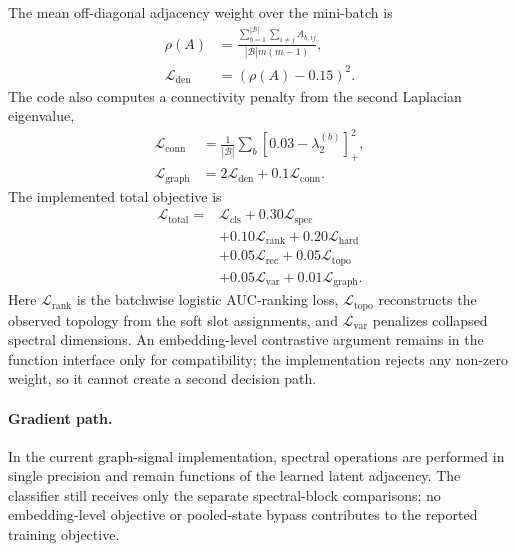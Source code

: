 \documentclass[authoryear,final,5p,times,twocolumn]{elsarticle}
\newcommand{\relu}[1]{\left[#1\right]_{+}}
\theoremstyle{plain}
\begin{document}
The mean off-diagonal adjacency weight over the mini-batch is
\begin{equation}
\begin{aligned}
\rho(A)
&=\frac{
\sum_{b=1}^{|\mathcal{B}|}\sum_{i\neq j}A_{b,ij}
}{|\mathcal{B}|m(m-1)},\\
\mathcal{L}_{\mathrm{den}}
&=(\rho(A)-0.15)^2.
\end{aligned}
\end{equation}
\begingroup
\color{green!50!black}
The code also computes a connectivity penalty from the second Laplacian
eigenvalue,
\begin{equation}
\begin{aligned}
\mathcal{L}_{\mathrm{conn}}
&=\frac{1}{|\mathcal{B}|}
\sum_b\relu{0.03-\lambda_2^{(b)}}^2,\\
\mathcal{L}_{\mathrm{graph}}
&=2\mathcal{L}_{\mathrm{den}}
+0.1\mathcal{L}_{\mathrm{conn}}.
\end{aligned}
\label{eq:graph_regularizer}
\end{equation}
\endgroup
The implemented total objective is
\begin{equation}
\boxed{
\begin{aligned}
\mathcal{L}_{\mathrm{total}}
={}&\mathcal{L}_{\mathrm{cls}}
+0.30\mathcal{L}_{\mathrm{spec}}\\
&+0.10\mathcal{L}_{\mathrm{rank}}
+0.20\mathcal{L}_{\mathrm{hard}}\\
&+0.05\mathcal{L}_{\mathrm{rec}}
+0.05\mathcal{L}_{\mathrm{topo}}\\
&+0.05\mathcal{L}_{\mathrm{var}}
+0.01\mathcal{L}_{\mathrm{graph}}.
\end{aligned}}
\label{eq:complete_loss}
\end{equation}
Here $\mathcal{L}_{\mathrm{rank}}$ is the batchwise logistic AUC-ranking loss,
$\mathcal{L}_{\mathrm{topo}}$ reconstructs the observed topology from the soft
slot assignments, and $\mathcal{L}_{\mathrm{var}}$ penalizes collapsed spectral
dimensions. An embedding-level contrastive argument remains in the function
interface only for compatibility; the implementation rejects any non-zero
weight, so it cannot create a second decision path.

\begingroup
\color{green!50!black}
\paragraph{Gradient path.}
In the current graph-signal implementation, spectral operations are performed
in single precision and remain functions of the learned latent adjacency. The
classifier still receives only the separate spectral-block comparisons; no
embedding-level objective or pooled-state bypass contributes to the reported
training objective.
\endgroup
\end{document}
